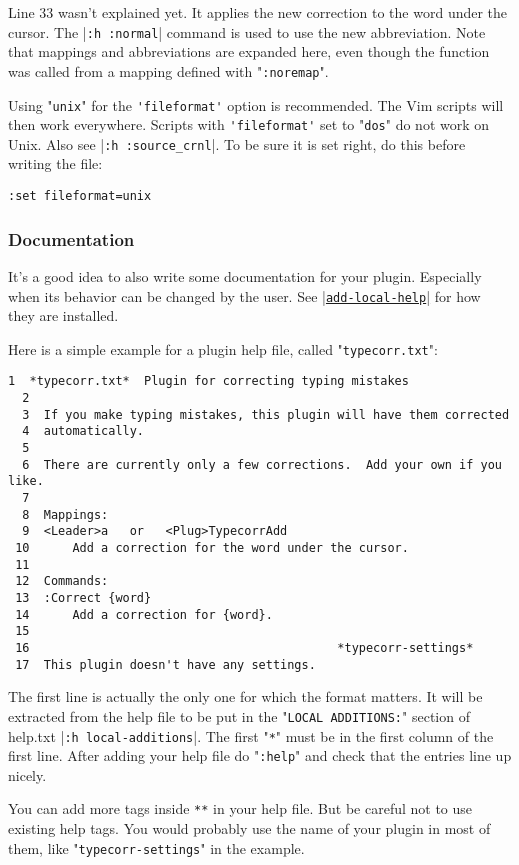 Line 33 wasn't explained yet.
It applies the new correction to the word under the cursor.
The |\verb!:h :normal!| command is used to use the new abbreviation.
Note that mappings and abbreviations are expanded here, even though the function was called from a mapping defined with "\verb!:noremap!".

Using "\verb!unix!" for the \verb!'fileformat'! option is recommended.
The Vim scripts will then work everywhere.
Scripts with \verb!'fileformat'! set to "\verb!dos!" do not work on Unix.
Also see |\verb!:h :source_crnl!|.
To be sure it is set right, do this before writing the file:

\begin{Verbatim}[samepage=true]
 :set fileformat=unix
\end{Verbatim}

\subsubsection{Documentation}
\label{write-local-help}
It's a good idea to also write some documentation for your plugin.
Especially when its behavior can be changed by the user.
See \hyperref[add-local-help]{|\texttt{add-local-help}|} for how they are installed.

Here is a simple example for a plugin help file, called "\verb!typecorr.txt!":

\begin{Verbatim}[samepage=true]
  1  *typecorr.txt*  Plugin for correcting typing mistakes
  2
  3  If you make typing mistakes, this plugin will have them corrected
  4  automatically.
  5
  6  There are currently only a few corrections.  Add your own if you like.
  7
  8  Mappings:
  9  <Leader>a   or   <Plug>TypecorrAdd
 10      Add a correction for the word under the cursor.
 11
 12  Commands:
 13  :Correct {word}
 14      Add a correction for {word}.
 15
 16                                           *typecorr-settings*
 17  This plugin doesn't have any settings.
\end{Verbatim}

The first line is actually the only one for which the format matters.
It will be extracted from the help file to be put in the "\verb!LOCAL ADDITIONS:!" section of help.txt |\verb!:h local-additions!|.
The first "\verb!*!" must be in the first column of the first line.
After adding your help file do "\verb!:help!" and check that the entries line up nicely.

You can add more tags inside \verb!**! in your help file.
But be careful not to use existing help tags.
You would probably use the name of your plugin in most of them, like "\verb!typecorr-settings!" in the example.

